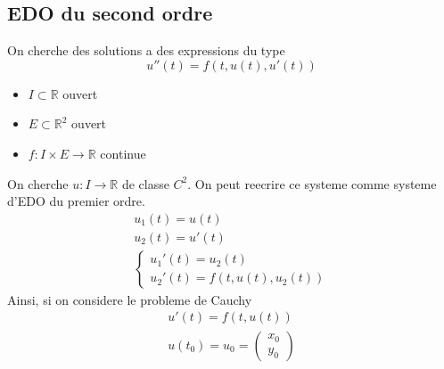 \documentclass[../main.tex]{subfiles}
\begin{document}
\subsection{EDO du second ordre}
On cherche des solutions a des expressions du type
\[ 
	u''( t) = f( t,u( t) , u'( t) ) 
\]
\begin{itemize}
\item $I \subset \mathbb{R}$ ouvert
\item $E \subset \mathbb{R}^{2}$ ouvert
\item $f: I \times E \to \mathbb{R}$ continue
\end{itemize}
On cherche $u: I \to \mathbb{R}$ de classe $C^{2}$.
On peut reecrire ce systeme comme systeme d'EDO du premier ordre.
\begin{align*}
	u_1( t) = u( t) \\
	u_2(t ) = u'(t ) \\
	\begin{cases}
		u_1'( t) = u_2( t) \\
		u_2'( t) = f( t,u( t) ,u_2( t) ) 
	\end{cases}
\end{align*}
Ainsi, si on considere le probleme de Cauchy
\begin{align*}
	u'( t) = f( t,u( t) ) \\
	u( t_0 ) = u_0 = \begin{pmatrix}
	x_0\\y_0
	\end{pmatrix} 
\end{align*}
\end{document}
